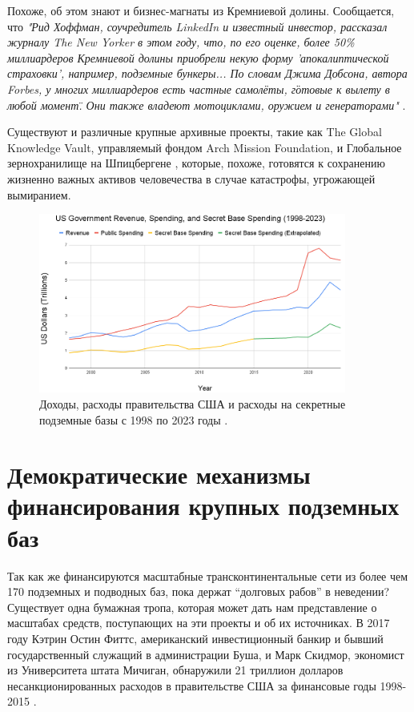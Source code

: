 \documentclass[10pt,twocolumn,letterpaper]{article}
\begin{document}
Похоже, об этом знают и бизнес-магнаты из Кремниевой долины. Сообщается, что \textit{"Рид Хоффман, соучредитель LinkedIn и известный инвестор, рассказал журналу The New Yorker в этом году, что, по его оценке, более 50\% миллиардеров Кремниевой долины приобрели некую форму 'апокалиптической страховки', например, подземные бункеры... По словам Джима Добсона, автора Forbes, у многих миллиардеров есть частные самолёты, \"готовые к вылету в любой момент\". Они также владеют мотоциклами, оружием и генераторами"} \cite{28}.

Существуют и различные крупные архивные проекты, такие как The Global Knowledge Vault, управляемый фондом Arch Mission Foundation, \cite{29} и Глобальное зернохранилище на Шпицбергене \cite{30}, которые, похоже, готовятся к сохранению жизненно важных активов человечества в случае катастрофы, угрожающей вымиранием.
\begin{figure}[t]
\begin{center}
\includegraphics[width=0.9\textwidth]{govcrop2.png}
\end{center}
   \caption{Доходы, расходы правительства США и расходы на секретные подземные базы с 1998 по 2023 годы \cite{19}.}
   \label{fig:9}
\end{figure}

\section{Демократические механизмы финансирования крупных подземных баз}

Так как же финансируются масштабные трансконтинентальные сети из более чем 170 подземных и подводных баз, пока держат “долговых рабов” в неведении? Существует одна бумажная тропа, которая может дать нам представление о масштабах средств, поступающих на эти проекты и об их источниках. В 2017 году Кэтрин Остин Фиттс, американский инвестиционный банкир и бывший государственный служащий в администрации Буша, и Марк Скидмор, экономист из Университета штата Мичиган, обнаружили 21 триллион долларов несанкционированных расходов в правительстве США за финансовые годы 1998-2015 \cite{11,12,13}.
\end{document}
